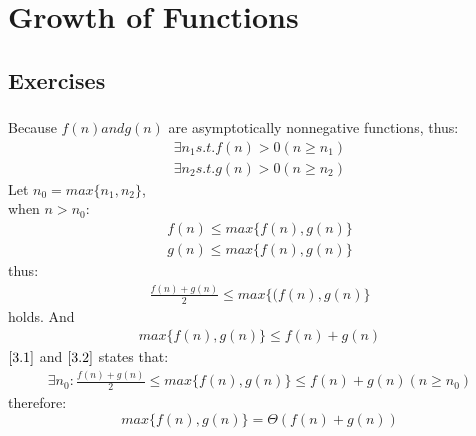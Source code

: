 \documentclass[paper=a4, fontsize=11pt,oneside]{book} %
\numberwithin{equation}{section} %
\numberwithin{figure}{section} %
\numberwithin{table}{section} %
\begin{document}

\newpage

\chapter{Growth of Functions}

\section{Exercises}
	\subsection{}
		Because $f(n) and g(n)$ are asymptotically nonnegative functions, thus:
		\begin{align*}
		\exists n_1 s.t. f(n) > 0 ( n \geq n_1) \\
		\exists n_2 s.t. g(n) > 0 (n \geq n_2) 
		\end{align*}
		Let $n_0 = max\{n_1, n_2\}$,\\
		when $n > n_0$:
		\begin{align*}
					f(n) \leq max\{f(n), g(n)\}\\
					g(n) \leq max\{f(n), g(n)\}
		\end{align*}
		thus:
		\begin{align}\label{3.1}
						 \frac{f(n) + g(n)}{2} \leq max\{(f(n), g(n)\}
		\end{align}
		holds. And \begin{align}\label{3.2}
	        		max\{f(n), g(n)\} \leq f(n) + g(n) 
		\end{align}
		$\eqref{3.1}$ and $\eqref{3.2}$ states that: 
		\begin{align*}
		\exists n_0: \frac{f(n) + g(n)}{2} \leq max\{f(n), g(n)\} \leq f(n) + g(n) (n \geq n_0)
		\end{align*}
		therefore:
		\begin{equation*}
		max\{f(n), g(n)\} = \Theta (f(n) + g(n))
		\end{equation*}
		
\end{document}
